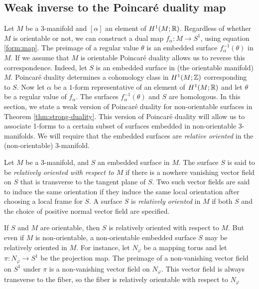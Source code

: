 \subsection{Weak inverse to the Poincar\'e duality map}
\label{sec:weak-inverse-poinc}

Let $M$ be a 3-manifold and $[\alpha]$ an element of $H^1(M;\mathbb{R})$.  Regardless of whether $M$ is orientable or not, we can construct a dual map $f_\alpha:M\rightarrow S^1$, using equation \eqref{form:map}.
The preimage of a regular value $\theta$ is an embedded surface $f_{\alpha}^{-1}(\theta)$ in $M$.
If we assume that $M$ is orientable Poincar\'e duality allows us to reverse this correspondence.  Indeed, let $S$ is an embedded surface in (the orientable manifold) $M$.  Poincar\'e duality determines a cohomology class in $H^1(M; \mathbb{Z})$ corresponding to $S$.
Now let $\alpha$ be a $1$-form representative of an element of $H^1(M;\mathbb{R})$ and let $\theta$ be a regular value of $f_{\alpha}$.  The surfaces $f_{\alpha}^{-1}(\theta)$ and $S$ are homologous.
In this section, we state a weak version of Poincar\'e duality for non-orientable surfaces in Theorem \ref{thm:strong-duality}.  This version of Poincar\'e duality will allow us to associate 1-forms to a certain subset of surfaces embedded in non-orientable 3-manifolds.
We will require that the embedded surfaces are \emph{relative oriented} in the (non-orientable) 3-manifold.

  Let $M$ be a $3$-manifold, and $S$ an embedded surface in $M$.
  The surface $S$ is said to be \emph{relatively oriented with respect to $M$} if there is a nowhere vanishing vector field on $S$ that is transverse to the tangent plane of $S$.
  Two such vector fields are said to induce the same orientation if they induce the same local orientation after choosing a local frame for $S$.
  A surface $S$ is \emph{relatively oriented} in $M$ if both $S$ and the choice of positive normal vector field are specified.

If $S$ and $M$ are orientable, then $S$ is relatively oriented with respect to $M$.
But even if $M$ is non-orientable, a non-orientable embedded surface $S$ may be relatively oriented in $M$.
For instance, let $N_{\varphi}$ be a mapping torus and let $\pi:N_{\varphi}\rightarrow S^1$ be the projection map.
The preimage of a non-vanishing vector field on $S^1$ under $\pi$ is a non-vanishing vector field on $N_{\varphi}$.  This vector field is always transverse to the fiber, so the fiber is relatively orientable with respect to $N_\varphi$

